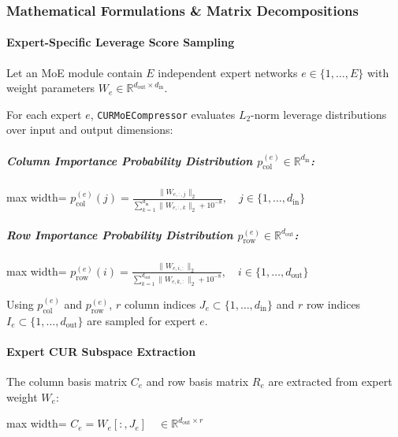\subsubsection*{Mathematical Formulations \& Matrix Decompositions}

\paragraph{Expert-Specific Leverage Score Sampling}
Let an MoE module contain $E$ independent expert networks $e \in \{1, \dots, E\}$ with weight parameters $W_e \in \mathbb{R}^{d_{\text{out}} \times d_{\text{in}}}$.

For each expert $e$, \texttt{CURMoECompressor} evaluates $L_2$-norm leverage distributions over input and output dimensions:

\subparagraph{Column Importance Probability Distribution $p_{\text{col}}^{(e)} \in \mathbb{R}^{d_{\text{in}}}$:}
\begin{center}
\begin{adjustbox}{max width=\columnwidth}
$\displaystyle
p_{\text{col}}^{(e)}(j) = \frac{\|W_{e, :, j}\|_2}{\sum_{k=1}^{d_{\text{in}}} \|W_{e, :, k}\|_2 + 10^{-8}}, \quad j \in \{1, \dots, d_{\text{in}}\}
$
\end{adjustbox}
\end{center}

\subparagraph{Row Importance Probability Distribution $p_{\text{row}}^{(e)} \in \mathbb{R}^{d_{\text{out}}}$:}
\begin{center}
\begin{adjustbox}{max width=\columnwidth}
$\displaystyle
p_{\text{row}}^{(e)}(i) = \frac{\|W_{e, i, :}\|_2}{\sum_{k=1}^{d_{\text{out}}} \|W_{e, k, :}\|_2 + 10^{-8}}, \quad i \in \{1, \dots, d_{\text{out}}\}
$
\end{adjustbox}
\end{center}

Using $p_{\text{col}}^{(e)}$ and $p_{\text{row}}^{(e)}$, $r$ column indices $J_e \subset \{1, \dots, d_{\text{in}}\}$ and $r$ row indices $I_e \subset \{1, \dots, d_{\text{out}}\}$ are sampled for expert $e$.

\paragraph{Expert CUR Subspace Extraction}
The column basis matrix $C_e$ and row basis matrix $R_e$ are extracted from expert weight $W_e$:

\begin{center}
\begin{adjustbox}{max width=\columnwidth}
$\displaystyle
C_e = W_e[:, J_e] \quad \in \mathbb{R}^{d_{\text{out}} \times r}
$
\end{adjustbox}
\end{center}

